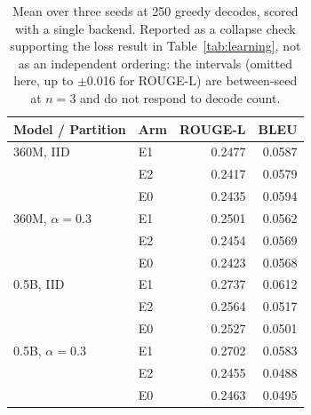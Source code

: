 \documentclass[11pt]{article}
\begin{document}
\begin{table}[h]
\centering
\small
\setlength{\tabcolsep}{4pt}
\begin{tabular}{llrr}
\toprule
\textbf{Model / Partition} & \textbf{Arm} & \textbf{ROUGE-L} & \textbf{BLEU} \\
\midrule
360M, IID    & E1 & 0.2477 & 0.0587 \\
             & E2 & 0.2417 & 0.0579 \\
             & E0 & 0.2435 & 0.0594 \\
360M, $\alpha{=}0.3$ & E1 & 0.2501 & 0.0562 \\
             & E2 & 0.2454 & 0.0569 \\
             & E0 & 0.2423 & 0.0568 \\
\midrule
0.5B, IID    & E1 & 0.2737 & 0.0612 \\
             & E2 & 0.2564 & 0.0517 \\
             & E0 & 0.2527 & 0.0501 \\
0.5B, $\alpha{=}0.3$ & E1 & 0.2702 & 0.0583 \\
             & E2 & 0.2455 & 0.0488 \\
             & E0 & 0.2463 & 0.0495 \\
\bottomrule
\end{tabular}
\caption{Mean over three seeds at 250 greedy decodes, scored with a single backend. Reported as a collapse check supporting the loss result in Table~\ref{tab:learning}, not as an independent ordering: the intervals (omitted here, up to $\pm$0.016 for ROUGE-L) are between-seed at $n{=}3$ and do not respond to decode count.}
\label{tab:gen}
\end{table}
\end{document}
